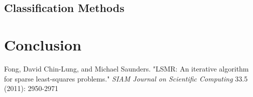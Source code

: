 \documentclass[11pt]{amsart}
\begin{document}
\subsection{Classification Methods}



\section{Conclusion}


\begingroup
\begin{thebibliography}{9}

Fong, David Chin-Lung, and Michael Saunders. "LSMR: An iterative algorithm for sparse least-squares problems."
\emph{SIAM Journal on Scientific Computing} 33.5 (2011): 2950-2971

\end{thebibliography}
\endgroup
\end{document}
